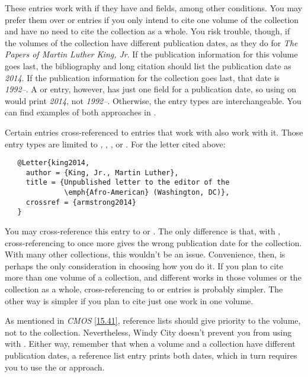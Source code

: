 \documentclass[11pt,letterpaper,oneside]{article}
\begin{document}
These entries work with  if they have 
and  fields, among other conditions. You may
prefer them over  or  entries if
you only intend to cite one volume of the collection and have no need
to cite the collection as a whole. You risk trouble, though, if the
volumes of the collection have different publication dates, as they do
for \textit{The Papers of Martin Luther King, Jr}. If the publication
information for this volume goes last, the bibliography and long
citation should list the publication date as \textit{2014}. If the
publication information for the collection goes last, that date is
\textit{1992–}. A  or  entry,
however, has just one field for a publication date, so using
 on  would print \textit{2014}, not
\textit{1992–}. Otherwise, the entry types are interchangeable. You
can find examples of both approaches in .

Certain entries cross-referenced to entries that work with
 also work with it. Those entry types are limited to
, , , or
. For the letter cited above:

\begin{verbatim}
   @Letter{king2014,
     author = {King, Jr., Martin Luther},
     title = {Unpublished letter to the editor of the
              \emph{Afro-American} (Washington, DC)},
     crossref = {armstrong2014}
   }
\end{verbatim}

\noindent You may cross-reference this entry to
 or . The only difference
is that, with , cross-referencing to
 once more gives the wrong publication date for
the collection. With many other collections, this wouldn't be an
issue. Convenience, then, is perhaps the only consideration in
choosing how you do it. If you plan to cite more than one volume of a
collection, and different works in those volumes or the collection as
a whole, cross-referencing to  or 
entries is probably simpler. The other way is simpler if you plan to
cite just one work in one volume.

As mentioned in \textit{CMOS} \ref{15.41}, reference lists should give
priority to the volume, not to the collection. Nevertheless, Windy
City doesn't prevent you from using  with .
Either way, remember that when a volume and a collection have
different publication dates, a reference list entry prints both dates,
which in turn requires you to use the  or
 approach.
\end{document}
